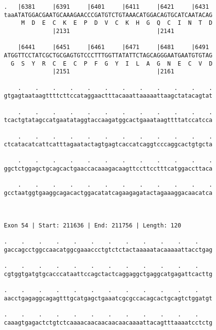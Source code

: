 \documentclass{article}
\begin{document}
\begin{Verbatim}
.   |6381     |6391     |6401     |6411     |6421     |6431 
taaATATGGACGAATGCAAAGAACCCGATGTCTGTAAACATGGACAGTGCATCAATACAG
     M  D  E  C  K  E  P  D  V  C  K  H  G  Q  C  I  N  T  D
              |2131                         |2141           
  
    |6441     |6451     |6461     |6471     |6481     |6491 
ATGGTTCCTATCGCTGCGAGTGTCCCTTTGGTTATATTCTAGCAGGGAATGAATGTGTAG
  G  S  Y  R  C  E  C  P  F  G  Y  I  L  A  G  N  E  C  V  D
              |2151                         |2161           
  
    .    .    .    .    .    .    .    .    .    .    .    .
gtgagtaataagttttcttccataggaactttacaaattaaaaattaagctatacagtat
                                                            
    .    .    .    .    .    .    .    .    .    .    .    .
tcactgtatagccatgaatataggtaccaagatggcactgaaataagttttatccatcca
                                                            
    .    .    .    .    .    .    .    .    .    .    .    .
ctcatacatcattcatttagaatactagtgagtcaccatcaggtcccaggcactgtgcta
                                                            
    .    .    .    .    .    .    .    .    .    .    .    .
ggctctggagctgcagcactgaaccacaaagacaagttccttcctttcatggaccttaca
                                                            
    .    .    .    .    .    .    .    .    .    .    .    .
gcctaatggtgaaggcagacactggacatatcagaagagatactagaaaggacaacatca
                                                            
                                                            
 
Exon 54 | Start: 211636 | End: 211756 | Length: 120
 
.    .    .    .    .    .    .    .    .    .    .    .    
gaccagcctggccaacatggcgaaaccctgtctctactaaaaatacaaaaattacctgag
                                                            
.    .    .    .    .    .    .    .    .    .    .    .    
cgtggtgatgtgcacccataattccagctactcaggaggctgaggcatgagattcacttg
                                                            
.    .    .    .    .    .    .    .    .    .    .    .    
aacctgagaggcagagtttgcatgagctgaaatcgcgccacagcactgcagtctggatgt
                                                            
.    .    .    .    .    .    .    .    .    .    .    .    
caaagtgagactctgtctcaaaacaacaacaacaacaaaattacagtttaaaatcctctg
                                                            

\end{Verbatim}
\end{document}

